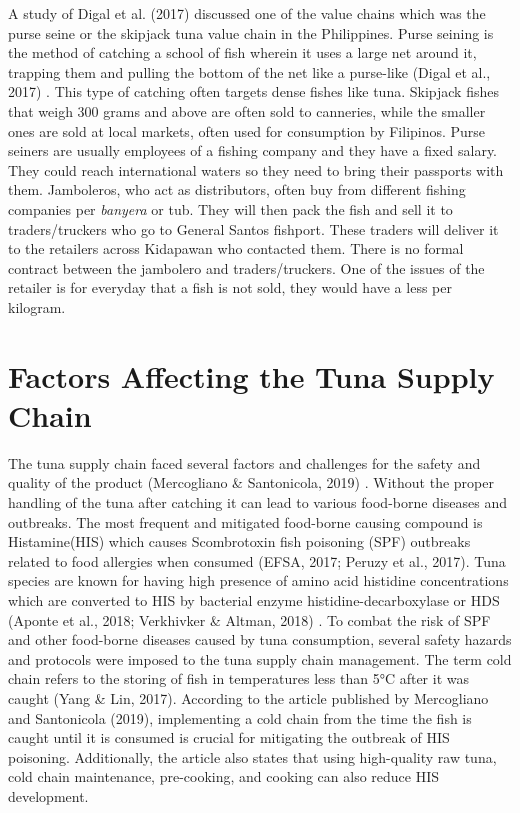 A study of Digal et al. (2017) \nocite{rrl-TSCSR2} discussed one of the value chains which was the purse seine or the skipjack tuna value chain in the Philippines. Purse seining is the method of catching a school of fish wherein it uses a large net around it, trapping them and pulling the bottom of the net like a purse-like (Digal et al., 2017) \nocite{rrl-TSCSR2} . This type of catching often targets dense fishes like tuna. Skipjack fishes that weigh 300 grams and above are often sold  to canneries, while the smaller ones are sold at local markets, often used for consumption by Filipinos. Purse seiners are usually employees of a fishing company and they have a fixed salary. They could reach international waters so they need to bring their passports with them. Jamboleros, who act as distributors, often buy from different fishing companies per \textit{banyera} or tub. They will then pack the fish and sell it to traders/truckers who go to General Santos fishport. These traders will deliver it to the retailers across Kidapawan who contacted them. There is no formal contract between the jambolero and traders/truckers. One of the issues of the retailer is for everyday that a fish is not sold, they would have a  less per kilogram.

\section{Factors Affecting the Tuna Supply Chain}

The tuna supply chain faced several factors and challenges for the safety and quality of the product (Mercogliano \& Santonicola, 2019) \nocite{rrl-FATSC1}. Without the proper handling of the tuna after catching it can lead to various food-borne diseases and outbreaks. The most frequent and mitigated food-borne causing compound is Histamine(HIS) which causes Scombrotoxin fish poisoning (SPF) outbreaks related to food allergies when consumed (EFSA, 2017; Peruzy et al., 2017). \nocite{rrl-FATSC2} Tuna species are known for having high presence of amino acid histidine concentrations which are converted to HIS by bacterial enzyme histidine-decarboxylase or HDS (Aponte et al., 2018; Verkhivker \& Altman, 2018) \nocite{rrl-FATSC3}\nocite{rrl-FATSC4}. To combat the risk of SPF and other food-borne diseases caused by tuna consumption, several safety hazards and protocols were imposed to the tuna supply chain management. The term cold chain refers to the storing of fish in temperatures less than 5°C after it was caught (Yang \& Lin, 2017)\nocite{rrl-FATSC5}. According to the article published by Mercogliano and Santonicola (2019)\nocite{rrl-FATSC1}, implementing a cold chain from the time the fish is caught until it is consumed is crucial for mitigating the outbreak of HIS poisoning. Additionally, the article also states that using high-quality raw tuna, cold chain maintenance, pre-cooking, and cooking can also reduce HIS development. 


